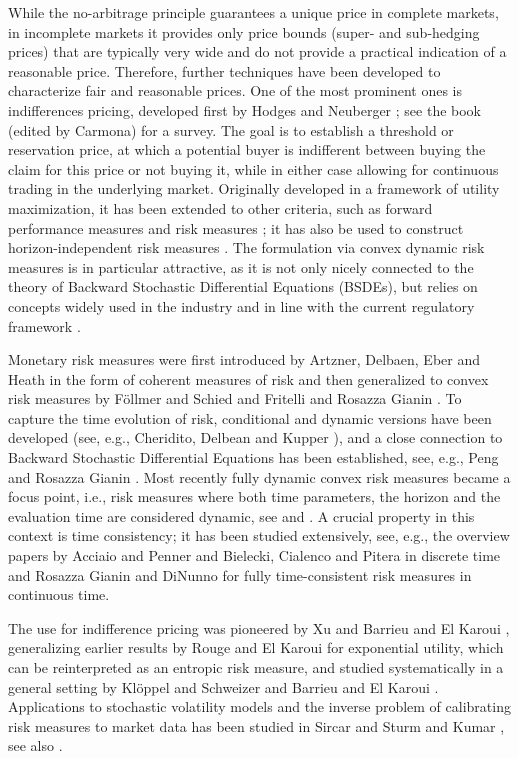 \documentclass{article}
\begin{document}
While the no-arbitrage principle guarantees a unique price in complete markets, in incomplete markets it provides only price bounds (super- and sub-hedging prices) that are typically very wide and do not provide a practical indication of a reasonable price. Therefore, further techniques have been developed to characterize fair and reasonable prices. One of the most prominent ones is indifferences pricing, developed first by Hodges and Neuberger \cite{HN89}; see the book \cite{Car09} (edited by Carmona) for a survey. The goal is to establish a threshold or reservation price, at which a potential buyer is indifferent between buying the claim for this price or not buying it, while in either case allowing for continuous trading in the underlying market. Originally developed in a framework of utility maximization, it has been extended to other criteria, such as forward performance measures \cite{LSZ12} and risk measures \cite{BEK09, KS05}; it has also be used to construct horizon-independent risk measures \cite{ZZ10, CHLZ19}. The formulation via convex dynamic risk measures is in particular attractive, as it is not only nicely connected to the theory of Backward Stochastic Differential Equations (BSDEs), but relies on concepts widely used in the industry and in line with the current regulatory framework \cite[Section 12]{Hul18}.

Monetary risk measures were first introduced by Artzner, Delbaen, Eber and Heath \cite{ADEH99} in the form of coherent measures of risk and then generalized to convex risk measures by F\"{o}llmer and Schied \cite{FS02} and Fritelli and Rosazza Gianin \cite{FRG05}. To capture the time evolution of risk, conditional and dynamic versions have been developed (see, e.g., Cheridito, Delbean and Kupper \cite{CDK04}), and a close connection to Backward Stochastic Differential Equations has been established, see, e.g.,  Peng \cite{Pen04} and Rosazza Gianin \cite{RG06}. Most recently fully dynamic convex risk measures became a focus point, i.e., risk measures where both time parameters, the horizon and the evaluation time are considered dynamic, see \cite{BNDN20} and \cite{RGDN24}. A crucial property in this context is time consistency; it has been studied extensively, see, e.g., the overview papers by Acciaio and Penner \cite{AP11} and Bielecki, Cialenco and Pitera \cite{BCP17} in discrete time and Rosazza Gianin and DiNunno \cite{RGDN24} for fully time-consistent risk measures in continuous time.

The use for indifference pricing was pioneered by Xu \cite{Xu06} and Barrieu and El Karoui \cite{BEK04}, generalizing earlier results by Rouge and El Karoui \cite{REK00} for exponential utility, which can be reinterpreted as an entropic risk measure, and studied systematically in a general setting by Kl\"{o}ppel and Schweizer \cite{KS05} and Barrieu and El Karoui \cite{BEK09}. Applications to stochastic volatility models and the inverse problem of calibrating risk measures to market data has been studied in Sircar and Sturm \cite{SS15} and Kumar \cite{Kum15}, see also \cite{ES10}.
\end{document}
